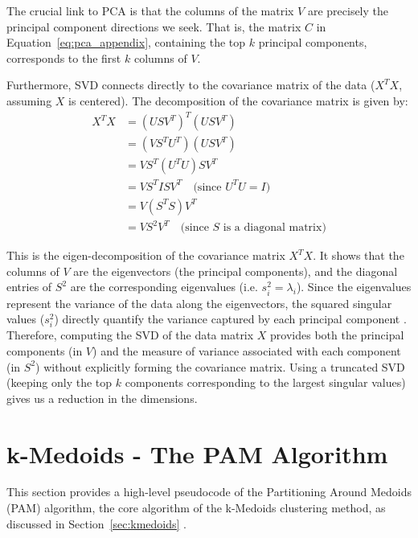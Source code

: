\documentclass[10pt,oneside]{report}
\begin{document}
The crucial link to PCA is that the columns of the matrix $V$ are precisely the principal component directions we seek. That is, the matrix $C$ in Equation~\ref{eq:pca_appendix}, containing the top $k$ principal components, corresponds to the first $k$ columns of $V$. 

Furthermore, SVD connects directly to the covariance matrix of the data ($X^TX$, assuming $X$ is centered). The decomposition of the covariance matrix is given by:
\begin{align}
    X^TX &= (USV^T)^T (USV^T) \\ %
         &= (VS^T U^T) (USV^T) \\ %
         &= V S^T (U^T U) S V^T \\ %
         &= V S^T I S V^T \quad \text{(since } U^T U = I \text{)} \\
         &= V (S^T S) V^T \\
         &= V S^2 V^T\quad \text{(since } S \text{ is a diagonal matrix)}
         \label{eq:svd_covariance_appendix} %
\end{align}

This is the eigen-decomposition of the covariance matrix $X^TX$. It shows that the columns of $V$ are the eigenvectors (the principal components), and the diagonal entries of $S^2$  are the corresponding eigenvalues (i.e. $s_i^2 = \lambda_i$). Since the eigenvalues represent the variance of the data along the eigenvectors, the squared singular values ($s_i^2$) directly quantify the variance captured by each principal component \cite{udell2016generalized}. Therefore, computing the SVD of the data matrix $X$ provides both the principal components (in $V$) and the measure of variance associated with each component (in $S^2$) without explicitly forming the covariance matrix. Using a truncated SVD (keeping only the top $k$ components corresponding to the largest singular values) gives us a reduction in the dimensions.


\clearpage
\section{k-Medoids - The PAM Algorithm}\label{app:pam}
This section provides a high-level pseudocode of the Partitioning Around Medoids (PAM) algorithm, the core algorithm of the k-Medoids clustering method, as discussed in Section~\ref{sec:kmedoids} \cite{kmedoids}.
\end{document}
